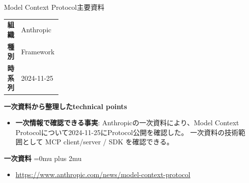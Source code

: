 \begin{technicalnote}{Model Context Protocol}{主要資料}
\begingroup
\begin{tabularx}{\linewidth}{@{}>{\bfseries}p{0.22\linewidth}X@{}}
組織 & Anthropic \\
種別 & Framework \\
時系列 & 2024-11-25 \\
\end{tabularx}
\smallskip
{\bfseries 一次資料から整理したtechnical points}
\begin{itemize}[leftmargin=1.5em,itemsep=0.35em]
\item \textbf{一次情報で確認できる事実}: Anthropicの一次資料により、Model Context Protocolについて2024-11-25にProtocol公開を確認した。 一次資料の技術範囲として MCP client/server / SDK を確認できる。
\end{itemize}
\begin{minipage}{\linewidth}
\begin{samepage}
{\bfseries 一次資料}
\begingroup\sloppy
\Urlmuskip=0mu plus 2mu\relax
\begin{itemize}[leftmargin=1.5em,itemsep=0.25em]
\item {\scriptsize\url{https://www.anthropic.com/news/model-context-protocol}}
\end{itemize}
\endgroup
\end{samepage}
\end{minipage}
\endgroup
\end{technicalnote}
\medskip

